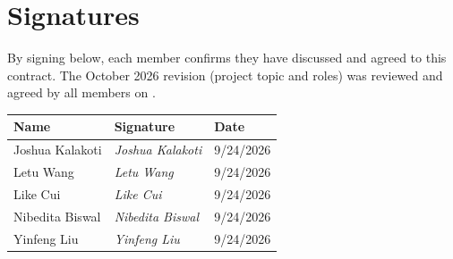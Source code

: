 \documentclass[11pt]{article}
\renewcommand{\arraystretch}{1.3}
\begin{document}
\section{Signatures}

By signing below, each member confirms they have discussed and agreed to this contract. The October 2026 revision (project topic and roles) was reviewed and agreed by all members on \underline{\hspace{3cm}}.

\vspace{4pt}
\renewcommand{\arraystretch}{1.8}
\begin{tabularx}{\textwidth}{@{}p{4.5cm}Lp{3cm}@{}}
\toprule
\textbf{Name} & \textbf{Signature} & \textbf{Date} \\
\midrule
Joshua Kalakoti & \textit{Joshua Kalakoti} & 9/24/2026 \\
Letu Wang & \textit{Letu Wang} & 9/24/2026 \\
Like Cui & \textit{Like Cui} & 9/24/2026 \\
Nibedita Biswal & \textit{Nibedita Biswal} & 9/24/2026 \\
Yinfeng Liu & \textit{Yinfeng Liu} & 9/24/2026 \\
\bottomrule
\end{tabularx}
\end{document}

